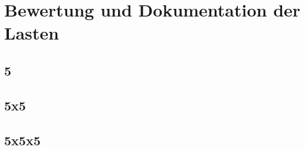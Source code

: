 \section{Bewertung und Dokumentation der Lasten}

\subsection{5}

\subsection{5x5}

\subsection{5x5x5}

\clearpage